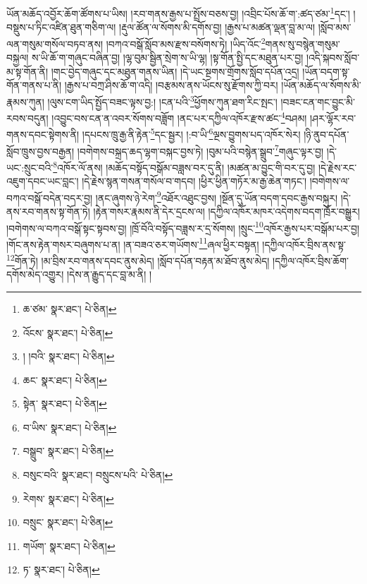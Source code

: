 ཡོན་མཆོད་འབྱོར་ཆོག་ཚོགས་པ་ཡིས། །རབ་གནས་རྒྱས་པ་སྤྲོས་བཅས་བྱ། །འབྲིང་པོས་ཆོ་ག་:ཚད་ཙམ་\footnote{ཆ་ཙམ་  སྣར་ཐང་།  པེ་ཅིན། }དང་། །བསྡུས་པ་ཏིང་འཛིན་ཐུན་གཅིག་ལ། །རྡུལ་ཚོན་ལ་སོགས་མི་དགོས་བྱ། །རྒྱས་པ་མཚན་ལྡན་བླ་མ་ལ། །སློབ་མས་ལན་གསུམ་གསོལ་བཏབ་ནས། །བཀའ་བསྒོ་སློབ་མས་རྫས་བསོགས་ཏེ། །ཡིད་འོང་\footnote{འོངས་  སྣར་ཐང་།  པེ་ཅིན། }གནས་སུ་བསྙེན་གསུམ་བསྐྱལ། ས་ཡི་ཆོ་ག་གཞུང་བཞིན་བྱ། །ལྷ་བུམ་སྦྱིན་སྲེག་ས་ཡི་ལྷ། །སྟ་གོན་སྤྱི་དང་མཐུན་པར་བྱ། །འདི་སྐབས་སློབ་མ་སྟ་གོན་ནི། །གང་བྱེད་གཞུང་དང་མཐུན་གནས་ཡིན། །དེ་ཡང་སྔགས་གྲོགས་སློབ་དཔོན་འདྲ། །ཡོན་བདག་སྟ་གོན་གནས་པ་ནི། །རྒྱས་པ་བཀྲ་ཤིས་ཆོ་ག་འདི། །བརྩམས་ནས་ཡོངས་སུ་རྫོགས་ཀྱི་བར། །ཡོན་མཆོད་ལ་སོགས་མི་རྣམས་ཀུན། །ལུས་ངག་ཡིད་སྤྱོད་བཟང་ལྟས་བྱ:། །ངན་པའི་\footnote{། །བའི་  སྣར་ཐང་།  པེ་ཅིན། }ཕྱོགས་ཀུན་ཐག་རིང་སྤང་། །བཟང་ངན་གང་བྱུང་མི་རབས་བདུན། །འབྱུང་བས་ངན་ན་འབར་སོགས་བཟློག །ནང་པར་དཀྱིལ་འཁོར་རྫས་ཚང་\footnote{ཆང་  སྣར་ཐང་།  པེ་ཅིན། }བཤམ། །ཤར་ལྷོར་རབ་གནས་དབང་སྟེགས་ནི། །དཔངས་ཁྲུ་རྒྱ་ནི་རྟེན་\footnote{སྟེན་  སྣར་ཐང་།  པེ་ཅིན། }དང་སྦྱར། །:བ་ཡི་\footnote{བ་ཡིས་  སྣར་ཐང་།  པེ་ཅིན། }ལྔས་བྱུགས་པད་འཁོར་སེར། །ཉི་ནུབ་དཔོན་སློབ་ཁྲུས་བྱས་བརྒྱན། །བགེགས་བསྐྲད་ཆད་ལྷག་བསྐང་བྱས་ཏེ། །བུམ་པའི་བསྙེན་སྒྲུབ་\footnote{བསྒྲུབ་  སྣར་ཐང་།  པེ་ཅིན། }གཞུང་ལྟར་བྱ། །དེ་ཡང་:སྲུང་བའི་\footnote{བསུང་བའི་  སྣར་ཐང་། བསྲུངས་པའི་  པེ་ཅིན། }འཁོར་ལོ་ནས། །མཆོད་བསྟོད་བསྒོམ་བཟླས་བར་དུ་ནི། །མཚན་མ་བྱུང་གི་བར་དུ་བྱ། །དེ་རྗེས་རང་འཇུག་དབང་ཡང་བླང་། །དེ་རྗེས་སྙན་གསན་གསོལ་བ་གདབ། །ཕྱིར་ཕྱིན་གཏོར་མ་རྒྱ་ཆེན་གཏང་། །བགེགས་ལ་བཀའ་བསྒོ་བདེན་བདར་བྱ། །ནང་ཞུགས་ཉེ་རེག་\footnote{རེགས་  སྣར་ཐང་།  པེ་ཅིན། }འཐོར་འཐུང་བྱས། །སྔོན་དུ་ཡོན་བདག་དབང་རྒྱས་བསྐུར། །དེ་ནས་རབ་གནས་སྟ་གོན་ཏེ། །རྟེན་གསར་རྣམས་ནི་དེར་དྲངས་ལ། །དཀྱིལ་འཁོར་མཁར་འདེགས་བདག་ཁྲོར་བསྒྱུར། །བགེགས་ལ་བཀའ་བསྒོ་སྟང་སྟབས་བྱ། །ཁྲོ་བོའི་བསྟོད་བཟླས་ར་དྲ་སོགས། །སྲུང་\footnote{བསྲུང་  སྣར་ཐང་།  པེ་ཅིན། }འཁོར་རྒྱས་པར་བསྒོམ་པར་བྱ། །གོང་ནས་རྟེན་གསར་བཞུགས་པ་ན། །ན་བཟའ་ཅར་གཡོགས་\footnote{གཡོག་  སྣར་ཐང་།  པེ་ཅིན། }ཞལ་ཕྱིར་བསྟན། །དཀྱིལ་འཁོར་བྲིས་ནས་སྟ་\footnote{ཏ་  སྣར་ཐང་།  པེ་ཅིན། }གོན་ཏེ། །མ་བྲིས་རབ་གནས་དབང་ནུས་མེད། །སློབ་དཔོན་བརྟན་མ་ཐོབ་ནུས་མེད། །དཀྱིལ་འཁོར་བྲིས་ཆོག་དགོས་མེད་འགྱུར། །དེས་ན་རྒྱུད་དང་བླ་མ་ནི། །
